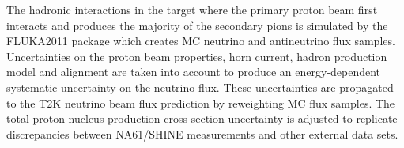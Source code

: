 The hadronic interactions in the target where the primary
proton beam first interacts and produces the majority of
the secondary pions is simulated by the FLUKA2011 package
which creates MC neutrino and antineutrino flux samples.
Uncertainties on the proton beam properties, horn current,
hadron production model and alignment are taken into
account to produce an energy-dependent systematic uncertainty
on the neutrino flux.
These uncertainties are propagated to the T2K neutrino beam flux
prediction by reweighting MC flux samples. 
The total proton-nucleus production cross section uncertainty
is adjusted to replicate discrepancies between NA61/SHINE measurements
and other external data sets. 
\\

